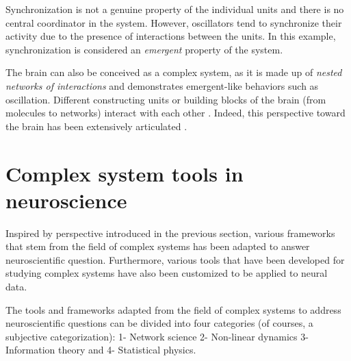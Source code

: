 Synchronization is not a genuine property of the individual units and there is no central coordinator in the system.
However, oscillators tend to synchronize their activity due to the presence of interactions between the units.
In this example, synchronization is considered an \emph{emergent} property of the system.

The brain can also be conceived as a complex system,
as it is made up of \emph{nested networks of interactions}
and demonstrates emergent-like behaviors such as oscillation.
Different constructing units or building blocks of the brain (from molecules to networks) interact with each other \cite[Chapter 1]{churchlandComputationalBrain1992}.
Indeed, this perspective toward the brain has been extensively articulated
\cite{siegelmannComplexSystemsScience2010,wernerConsciousnessViewedFramework2013,spornsConnectivityComplexityRelationship2000,singerBrainComplexSelforganizing2009,olbrichSleepingBrainComplex2011b,kochSystemsBiologyModular2012,bullmoreComplexBrainNetworks2009a,lynnHumanInformationProcessing2020,betzelMultiscaleBrainNetworks2017,bassettUnderstandingComplexityHuman2011,mitchellComplexityGuidedTour2011,buzsakiRhythmsBrain2011,chialvoEmergentComplexNeural2010c}.

\section{Complex system tools  in neuroscience}\label{sec:tools-used-neur}

Inspired by perspective introduced in the previous section,
various frameworks that stem from the field of complex systems
has been adapted to answer neuroscientific question.
Furthermore, various tools that have been developed for studying complex systems have also been customized to be applied to neural data.

The tools and frameworks adapted from the field of complex systems to address neuroscientific questions can be divided into four categories
(of courses, a subjective categorization):
1- Network science 2- Non-linear dynamics  3- Information theory and 4- Statistical physics.

